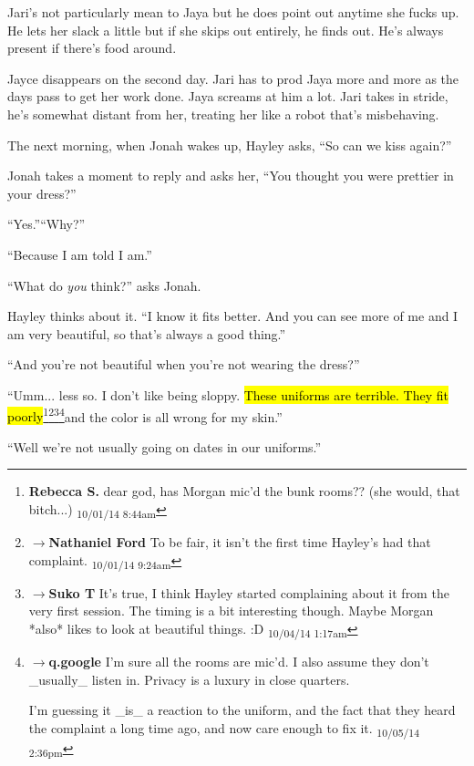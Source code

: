 Jari's not particularly mean to Jaya but he does point out anytime she fucks up.  He lets her slack a little but if she skips out entirely, he finds out.  He's always present if there's food around.



Jayce disappears on the second day.  Jari has to prod Jaya more and more as the days pass to get her work done.  Jaya screams at him a lot.  Jari takes in stride, he's somewhat distant from her, treating her like a robot that's misbehaving.





The next morning, when Jonah wakes up, Hayley asks, ``So can we kiss again?''

Jonah takes a moment to reply and asks her, ``You thought you were prettier in your dress?''

``Yes.''``Why?''

``Because I am told I am.''

``What do \textit{you} think?'' asks Jonah.

Hayley thinks about it.  ``I know it fits better.  And you can see more of me and I am very beautiful, so that's always a good thing.''

``And you're not beautiful when you're not wearing the dress?''

``Umm... less so.  I don't like being sloppy.  \hl{These uniforms are terrible.  They fit poorly}\footnote{\textbf{Rebecca S. }dear god, has Morgan mic'd the bunk rooms?? (she would, that bitch...) \textsubscript{10/01/14 8:44am}}\footnote{$\rightarrow$\textbf{Nathaniel Ford }To be fair, it isn't the first time Hayley's had that complaint. \textsubscript{10/01/14 9:24am}}\footnote{$\rightarrow$\textbf{Suko T }It's true, I think Hayley started complaining about it from the very first session. The timing is a bit interesting though.  Maybe Morgan *also* likes to look at beautiful things. :D \textsubscript{10/04/14 1:17am}}\footnote{$\rightarrow$\textbf{q.google }I'm sure all the rooms are mic'd.  I also assume they don't \_usually\_ listen in.  Privacy is a luxury in close quarters.

I'm guessing it \_is\_ a reaction to the uniform, and the fact that they heard the complaint a long time ago, and now care enough to fix it. \textsubscript{10/05/14 2:36pm}}and the color is all wrong for my skin.''

``Well we're not usually going on dates in our uniforms.''

